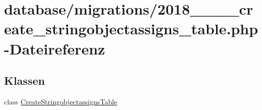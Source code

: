 \hypertarget{2018__06__19__120455__create__stringobjectassigns__table_8php}{}\section{database/migrations/2018\+\_\+\_\+\_\+\_\+create\+\_\+stringobjectassigns\+\_\+table.php-\/\+Dateireferenz}
\label{2018__06__19__120455__create__stringobjectassigns__table_8php}
\subsection*{Klassen}
\begin{DoxyCompactItemize}
\item 
class \hyperlink{classCreateStringobjectassignsTable}{Create\+Stringobjectassigns\+Table}
\end{DoxyCompactItemize}

